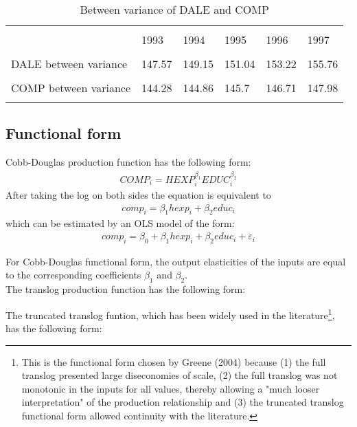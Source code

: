 \documentclass[12pt,a4paper]{article}\usepackage[]{graphicx}\usepackage[]{color}
\begin{document}
\begin{table}[htbp] \centering 
  \caption{Between variance of DALE and COMP} 
  \label{Between variance of DALE and COMP} 
  \normalsize
\begin{tabular}{p{5cm} p{1.2cm} p{1.2cm} p{1.2cm} p{1.2cm} p{1.2cm}} 
\\[-1.8ex]\hline 
\hline \\[-1.8ex] 
 & 1993 & 1994 & 1995 & 1996 & 1997 \\ 
\hline \\[-1.8ex] 
DALE between variance & 147.57 & 149.15 & 151.04 & 153.22 & 155.76 \\
\hline \\[-1.8ex] 
COMP between variance & 144.28 & 144.86 & 145.7 & 146.71 & 147.98 \\
\hline
\hline \\[-1.8ex] 
\end{tabular} 
\end{table}








\subsection{Functional form}
Cobb-Douglas production function has the following form:
\begin{gather}
COMP_i = HEXP_i^{\beta_1}EDUC_i^{\beta_2}
\end{gather}
After taking the log on both sides the equation is equivalent to
\begin{gather}
comp_i = \beta_1 hexp_i + \beta_2 educ_i
\end{gather}
which can be estimated by an OLS model of the form:
\begin{gather}
comp_i = \beta_0 + \beta_1 hexp_i + \beta_2 educ_i + \varepsilon_i
\end{gather}

For Cobb-Douglas functional form, the output elasticities of the inputs are equal to the corresponding coefficients $\beta_1$ and $\beta_2$. \\

The translog production function has the following form: 

The truncated translog funtion, which has been widely used in the literature\footnote{This is the functional form chosen by Greene (2004) because (1) the full translog presented large diseconomies of scale, (2) the full translog was not monotonic in the inputs for all values, thereby allowing a "much looser interpretation" of the production relationship and (3) the truncated translog functional form allowed continuity with the literature.}, has the following form:
\end{document}

